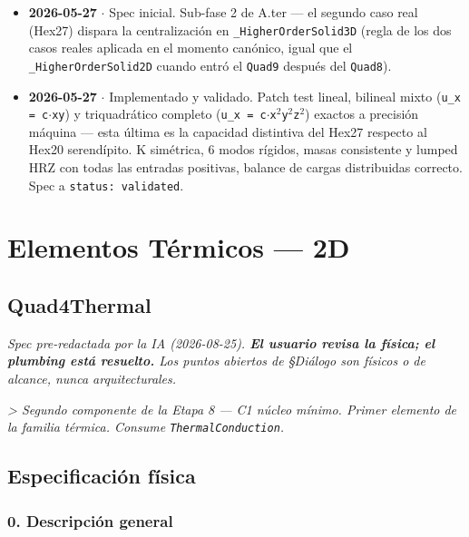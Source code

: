 \documentclass[11pt,letterpaper,oneside]{report}
\begin{document}
\begin{itemize}
  \item \textbf{2026-05-27} \ensuremath{\cdot} Spec inicial. Sub-fase 2 de A.ter --- el segundo caso real (Hex27) dispara la centralización en \texttt{\_HigherOrderSolid3D} (regla de los dos casos reales aplicada en el momento canónico, igual que el \texttt{\_HigherOrderSolid2D} cuando entró el \texttt{Quad9} después del \texttt{Quad8}).
  \item \textbf{2026-05-27} \ensuremath{\cdot} Implementado y validado. Patch test lineal, bilineal mixto (\texttt{u\_x = c\ensuremath{\cdot}xy}) y triquadrático completo (\texttt{u\_x = c\ensuremath{\cdot}x\ensuremath{^{2}}y\ensuremath{^{2}}z\ensuremath{^{2}}}) exactos a precisión máquina --- esta última es la capacidad distintiva del Hex27 respecto al Hex20 serendípito. K simétrica, 6 modos rígidos, masas consistente y lumped HRZ con todas las entradas positivas, balance de cargas distribuidas correcto. Spec a \texttt{status: validated}.
\end{itemize}


\newpage

\chapter{Elementos Térmicos — 2D}

\section{Quad4Thermal}



\textit{Spec pre-redactada por la IA (2026-08-25). \textbf{El usuario revisa la física; el plumbing está resuelto.} Los puntos abiertos de §Diálogo son físicos o de alcance, nunca arquitecturales.}

\textit{> Segundo componente de la Etapa 8 --- C1 núcleo mínimo. Primer elemento de la familia térmica. Consume \texttt{ThermalConduction}.}



\section{Especificación física}

\subsection{0. Descripción general}
\end{document}
